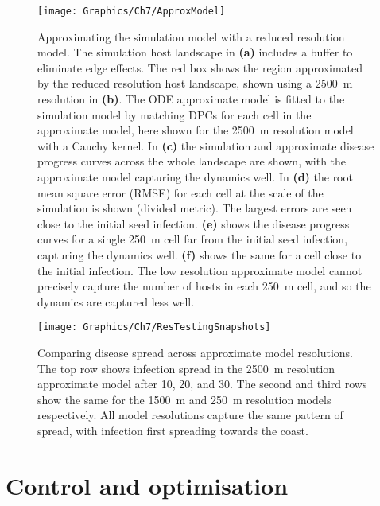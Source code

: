 \begin{figure}[H]
    \begin{center}
        \texttt{[image: Graphics/Ch7/ApproxModel]}
        \caption[Approximating the simulation model with a reduced resolution model]{Approximating the simulation model with a reduced resolution model. The simulation host landscape in \textbf{(a)} includes a buffer to eliminate edge effects. The red box shows the region approximated by the reduced resolution host landscape, shown using a \SI{2500}{\meter} resolution in \textbf{(b)}. The ODE approximate model is fitted to the simulation model by matching DPCs for each cell in the approximate model, here shown for the \SI{2500}{\meter} resolution model with a Cauchy kernel. In \textbf{(c)} the simulation and approximate disease progress curves across the whole landscape are shown, with the approximate model capturing the dynamics well. In \textbf{(d)} the root mean square error (RMSE) for each cell at the scale of the simulation is shown (divided metric). The largest errors are seen close to the initial seed infection. \textbf{(e)} shows the disease progress curves for a single \SI{250}{\meter} cell far from the initial seed infection, capturing the dynamics well. \textbf{(f)} shows the same for a cell close to the initial infection. The low resolution approximate model cannot precisely capture the number of hosts in each \SI{250}{\meter} cell, and so the dynamics are captured less well.\label{fig:ch7:approx_model}}
    \end{center}
\end{figure}

\begin{figure}
    \begin{center}
        \texttt{[image: Graphics/Ch7/ResTestingSnapshots]}
        \caption[Comparing disease spread across approximate model resolutions]{Comparing disease spread across approximate model resolutions. The top row shows infection spread in the \SI{2500}{\meter} resolution approximate model after 10, 20, and \SI{30}{\years}. The second and third rows show the same for the \SI{1500}{\meter} and \SI{250}{\meter} resolution models respectively. All model resolutions capture the same pattern of spread, with infection first spreading towards the coast.\label{fig:ch7:resolution_snapshots}}
    \end{center}
\end{figure}

\section{Control and optimisation\label{sec:ch7:optim_methods}}

